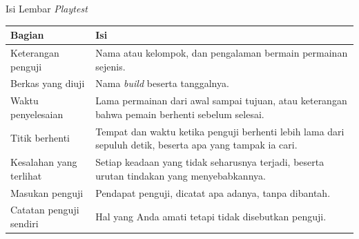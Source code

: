 \documentclass[aspectratio=169,10pt]{beamer}
\begin{document}
\begin{frame}{Isi Lembar \emph{Playtest}}
{\scriptsize
\renewcommand{\arraystretch}{1.12}
\begin{tabularx}{\textwidth}{@{}>{\raggedright\arraybackslash}p{3.5cm}
    >{\raggedright\arraybackslash}X@{}}
\toprule
\textbf{Bagian} & \textbf{Isi} \\
\midrule
Keterangan penguji & Nama atau kelompok, dan pengalaman bermain permainan
  sejenis. \\
\addlinespace
Berkas yang diuji & Nama \emph{build} beserta tanggalnya. \\
\addlinespace
Waktu penyelesaian & Lama permainan dari awal sampai tujuan, atau keterangan
  bahwa pemain berhenti sebelum selesai. \\
\addlinespace
Titik berhenti & Tempat dan waktu ketika penguji berhenti lebih lama dari
  sepuluh detik, beserta apa yang tampak ia cari. \\
\addlinespace
Kesalahan yang terlihat & Setiap keadaan yang tidak seharusnya terjadi,
  beserta urutan tindakan yang menyebabkannya. \\
\addlinespace
Masukan penguji & Pendapat penguji, dicatat apa adanya, tanpa dibantah. \\
\addlinespace
Catatan penguji sendiri & Hal yang Anda amati tetapi tidak disebutkan
  penguji. \\
\bottomrule
\end{tabularx}}
\end{frame}
\end{document}
